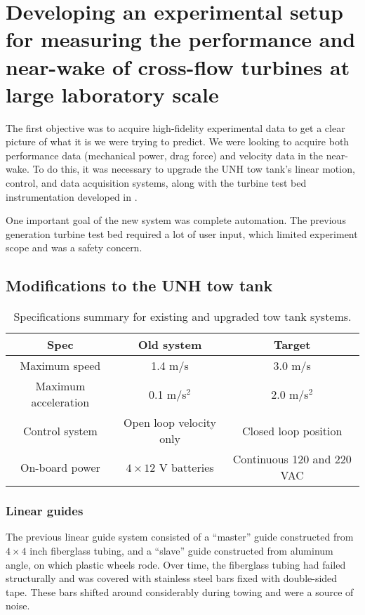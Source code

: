 \chapter{Developing an experimental setup for measuring the performance and
near-wake of cross-flow turbines at large laboratory scale}

The first objective was to acquire high-fidelity experimental data to get a
clear picture of what it is we were trying to predict. We were looking to
acquire both performance data (mechanical power, drag force) and velocity data
in the near-wake. To do this, it was necessary to upgrade the UNH tow tank's
linear motion, control, and data acquisition systems, along with the turbine
test bed instrumentation developed in \cite{Bachant2011-MS}.

One important goal of the new system was complete automation. The previous
generation turbine test bed required a lot of user input, which limited
experiment scope and was a safety concern.


\section{Modifications to the UNH tow tank}

\begin{table}
\centering
\begin{tabular}{c|c|c}
Spec & Old system & Target \\ 
\hline
Maximum speed & 1.4 m/s  & 3.0 m/s \\ 
Maximum acceleration & 0.1 m/s$^2$ & 2.0 m/s$^2$ \\ 
Control system & Open loop velocity only & Closed loop position \\ 
On-board power & $4\times12$ V batteries & Continuous 120 and 220 VAC \\ 
\end{tabular}
\caption{Specifications summary for existing and upgraded tow tank systems.} 
\label{tab:tow-tank-specs}
\end{table}

\subsection{Linear guides}

The previous linear guide system consisted of a ``master'' guide constructed
from $4 \times 4$ inch fiberglass tubing, and a ``slave'' guide constructed from
aluminum angle, on which plastic wheels rode. Over time, the fiberglass tubing
had failed structurally and was covered with stainless steel bars fixed with
double-sided tape. These bars shifted around considerably during towing and were
a source of noise.

